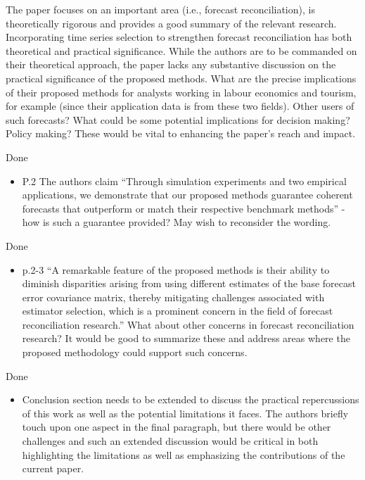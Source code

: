 \documentclass[11pt,a4paper,]{article}
\providecommand{\tightlist}{%
  \setlength{\itemsep}{0pt}\setlength{\parskip}{0pt}}
\renewenvironment{quote}
               {\list{}{\rightmargin\leftmargin}%
                \item\relax\color[RGB]{0,150,0}}
               {\endlist}
\begin{document}
The paper focuses on an important area (i.e., forecast reconciliation),
is theoretically rigorous and provides a good summary of the relevant
research. Incorporating time series selection to strengthen forecast
reconciliation has both theoretical and practical significance. While
the authors are to be commanded on their theoretical approach, the paper
lacks any substantive discussion on the practical significance of the
proposed methods. What are the precise implications of their proposed
methods for analysts working in labour economics and tourism, for
example (since their application data is from these two fields). Other
users of such forecasts? What could be some potential implications for
decision making? Policy making? These would be vital to enhancing the
paper's reach and impact.

\begin{quote}
Done
\end{quote}

\begin{itemize}
\tightlist
\item
  P.2 The authors claim ``Through simulation experiments and two
  empirical applications, we demonstrate that our proposed methods
  guarantee coherent forecasts that outperform or match their respective
  benchmark methods'' - how is such a guarantee provided? May wish to
  reconsider the wording.
\end{itemize}

\begin{quote}
Done
\end{quote}

\begin{itemize}
\tightlist
\item
  p.2-3 ``A remarkable feature of the proposed methods is their ability
  to diminish disparities arising from using different estimates of the
  base forecast error covariance matrix, thereby mitigating challenges
  associated with estimator selection, which is a prominent concern in
  the field of forecast reconciliation research.'' What about other
  concerns in forecast reconciliation research? It would be good to
  summarize these and address areas where the proposed methodology could
  support such concerns.
\end{itemize}

\begin{quote}
Done
\end{quote}

\begin{itemize}
\tightlist
\item
  Conclusion section needs to be extended to discuss the practical
  repercussions of this work as well as the potential limitations it
  faces. The authors briefly touch upon one aspect in the final
  paragraph, but there would be other challenges and such an extended
  discussion would be critical in both highlighting the limitations as
  well as emphasizing the contributions of the current paper.
\end{itemize}
\end{document}
